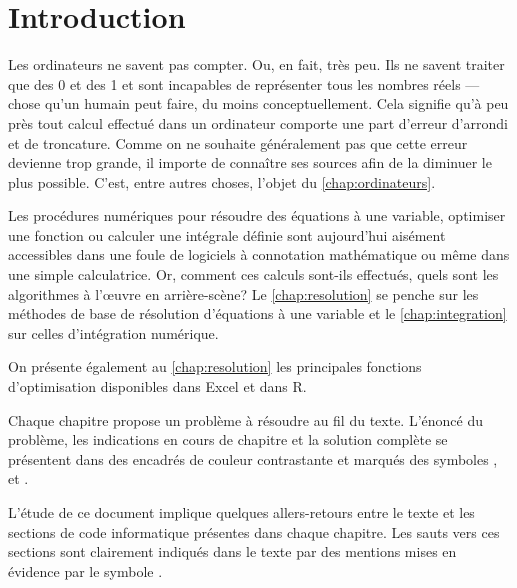 
\chapter*{Introduction}

Les ordinateurs ne savent pas compter. Ou, en fait, très peu. Ils ne
savent traiter que des 0 et des 1 et sont incapables de
représenter tous les nombres réels --- chose qu'un humain peut faire,
du moins conceptuellement. Cela signifie qu'à peu près tout calcul
effectué dans un ordinateur comporte une part d'erreur d'arrondi et de
troncature. Comme on ne souhaite généralement pas que cette erreur
devienne trop grande, il importe de connaître ses sources afin de la
diminuer le plus possible. C'est, entre autres choses, l'objet du
\autoref{chap:ordinateurs}.

Les procédures numériques pour résoudre des équations à une variable,
optimiser une fonction ou calculer une intégrale définie sont
aujourd'hui aisément accessibles dans une foule de logiciels à
connotation mathématique ou même dans une simple calculatrice. Or,
comment ces calculs sont-ils effectués, quels sont les algorithmes à
l'{\oe}uvre en arrière-scène? Le \autoref{chap:resolution} se
penche sur les méthodes de base de résolution d'équations à une
variable et le \autoref{chap:integration} sur celles
d'intégration numérique.

On présente également au \autoref{chap:resolution} les
principales fonctions d'optimisation disponibles dans Excel et dans R.

Chaque chapitre propose un problème à résoudre au fil du texte.
L'énoncé du problème, les indications en cours de chapitre et la
solution complète se présentent dans des encadrés de couleur
contrastante et marqués des symboles {\faCogs}, {\faBolt} et
{\faLightbulbO}.

L'étude de ce document implique quelques allers-retours entre le texte
et les sections de code informatique présentes dans chaque chapitre.
Les sauts vers ces sections sont clairement indiqués dans le texte par
des mentions mises en évidence par le symbole {\faFastForward}.

